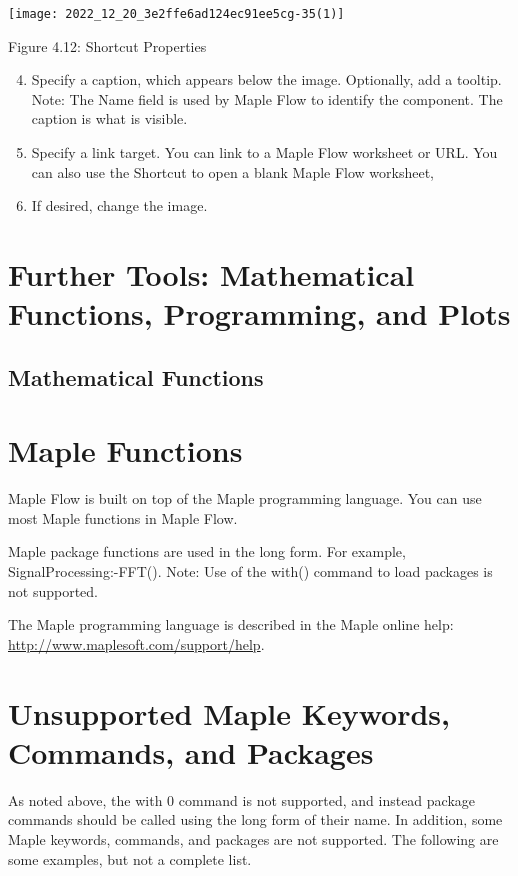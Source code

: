 \begin{center}
\texttt{[image: 2022\_12\_20\_3e2ffe6ad124ec91ee5cg-35(1)]}
\end{center}

Figure 4.12: Shortcut Properties

\begin{enumerate}
  \setcounter{enumi}{3}
  \item Specify a caption, which appears below the image. Optionally, add a tooltip. Note: The Name field is used by Maple Flow to identify the component. The caption is what is visible.

  \item Specify a link target. You can link to a Maple Flow worksheet or URL. You can also use the Shortcut to open a blank Maple Flow worksheet,

  \item If desired, change the image.

\end{enumerate}

\section{Further Tools: Mathematical Functions, Programming, and Plots}
\subsection{Mathematical Functions}
\section{Maple Functions}
Maple Flow is built on top of the Maple programming language. You can use most Maple functions in Maple Flow.

Maple package functions are used in the long form. For example, SignalProcessing:-FFT(). Note: Use of the with() command to load packages is not supported.

The Maple programming language is described in the Maple online help: \href{http://www.maplesoft.com/support/help}{http://www.maplesoft.com/support/help}.

\section{Unsupported Maple Keywords, Commands, and Packages}
As noted above, the with 0 command is not supported, and instead package commands should be called using the long form of their name. In addition, some Maple keywords, commands, and packages are not supported. The following are some examples, but not a complete list.

